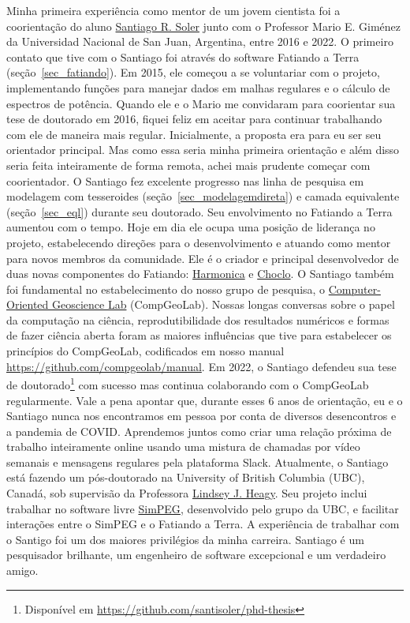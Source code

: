 \documentclass[10pt,a4paper,oneside]{book}
\newcommand{\SantiagoLink}{\href{https://www.santisoler.com/}{Santiago R. Soler}}
\begin{document}
Minha primeira experiência como mentor de um jovem cientista foi a coorientação
do aluno \SantiagoLink{} junto com o
Professor Mario E. Giménez da Universidad Nacional de San Juan, Argentina,
entre 2016 e 2022.
O primeiro contato que tive com o Santiago foi através do software
Fatiando a Terra (seção~\ref{sec_fatiando}).
Em 2015, ele começou a se voluntariar com o projeto, implementando funções
para manejar dados em malhas regulares e o cálculo de espectros de potência.
Quando ele e o Mario me convidaram para coorientar sua tese de doutorado em
2016, fiquei feliz em aceitar para continuar trabalhando com ele de maneira
mais regular.
Inicialmente, a proposta era para eu ser seu orientador principal.
Mas como essa seria minha primeira orientação e além disso seria feita
inteiramente de forma remota, achei mais prudente começar com coorientador.
O Santiago fez excelente progresso nas linha de pesquisa em modelagem com
tesseroides (seção~\ref{sec_modelagemdireta}) e camada equivalente
(seção~\ref{sec_eql}) durante seu doutorado.
Seu envolvimento no Fatiando a Terra aumentou com o tempo. Hoje em dia ele
ocupa uma posição de liderança no projeto, estabelecendo direções para o
desenvolvimento e atuando como mentor para novos membros da comunidade.
Ele é o criador e principal desenvolvedor de duas novas componentes do
Fatiando: \href{https://www.fatiando.org/harmonica}{Harmonica} e
\href{https://www.fatiando.org/choclo/}{Choclo}.
O Santiago também foi fundamental no estabelecimento do nosso grupo de pesquisa,
o \href{https://www.compgeolab.org/}{Computer-Oriented Geoscience Lab}
(CompGeoLab).
Nossas longas conversas sobre o papel da computação na ciência,
reprodutibilidade dos resultados numéricos e formas de fazer ciência aberta
foram as maiores influências que tive para estabelecer os princípios do
CompGeoLab, codificados em nosso manual
\url{https://github.com/compgeolab/manual}.
Em 2022, o Santiago defendeu sua tese de doutorado\footnote{Disponível em
\url{https://github.com/santisoler/phd-thesis}} com sucesso mas continua
colaborando com o CompGeoLab regularmente.
Vale a pena apontar que, durante esses 6 anos de orientação, eu e o Santiago
nunca nos encontramos em pessoa por conta de diversos desencontros e a pandemia
de COVID.
Aprendemos juntos como criar uma relação próxima de trabalho inteiramente
online usando uma mistura de chamadas por vídeo semanais e mensagens regulares
pela plataforma Slack.
Atualmente, o Santiago está fazendo um pós-doutorado na University of British
Columbia (UBC), Canadá, sob supervisão da Professora
\href{https://lindseyjh.ca/}{Lindsey J. Heagy}.
Seu projeto inclui trabalhar no software livre
\href{https://simpeg.xyz/}{SimPEG}, desenvolvido pelo grupo da UBC, e facilitar
interações entre o SimPEG e o Fatiando a Terra.
A experiência de trabalhar com o Santigo foi um dos maiores privilégios da
minha carreira.
Santiago é um pesquisador brilhante, um engenheiro de software excepcional
e um verdadeiro amigo.
\end{document}
